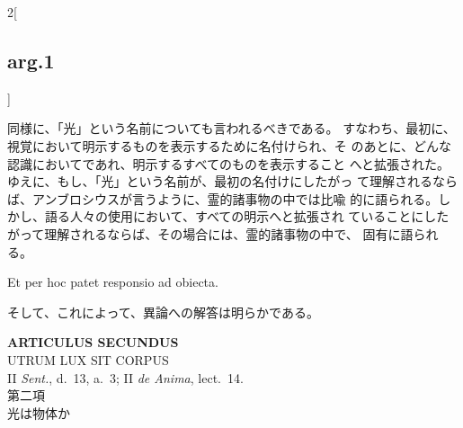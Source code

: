 \documentclass[paper=a4paper,fontsize=10pt,jafontsize=9pt,titlepage]{jlreq}
\begin{document}
\begin{paracol}{2}[\subsection{arg.1}]
\switchcolumn

同様に、「光」という名前についても言われるべきである。
すなわち、最初に、視覚において明示するものを表示するために名付けられ、そ
 のあとに、どんな認識においてであれ、明示するすべてのものを表示すること
 へと拡張された。ゆえに、もし、「光」という名前が、最初の名付けにしたがっ
 て理解されるならば、アンブロシウスが言うように、霊的諸事物の中では比喩
 的に語られる。しかし、語る人々の使用において、すべての明示へと拡張され
 ていることにしたがって理解されるならば、その場合には、霊的諸事物の中で、
 固有に語られる。

\switchcolumn*

\noindent
Et per hoc patet responsio ad obiecta.

\switchcolumn

そして、これによって、異論への解答は明らかである。

\end{paracol}
\newpage
{}
{}
\setcounter{section}{2}
\setcounter{subsection}{0}






\begin{center}
 {\Large {\bfseries ARTICULUS SECUNDUS}}\\
 {\large UTRUM LUX SIT CORPUS}\\
 {\footnotesize II {\itshape Sent.}, d.~13, a.~3; II {\itshape de
 Anima}, lect.~14.}\\
 {\Large 第二項\\光は物体か}
\end{center}
\end{document}
